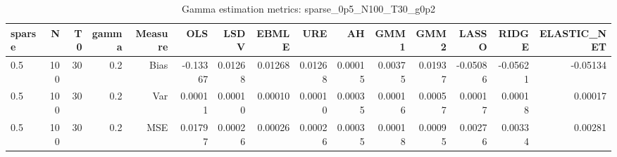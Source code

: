 \begin{table}[!htbp]\centering
\caption{Gamma estimation metrics: sparse_0p5_N100_T30_g0p2}
\label{tab:table1_sparse_0p5_N100_T30_g0p2}
\begin{tabular}{lrrrrrrrrrrrrrr}
\hline
sparse & N & T0 & gamma & Measure & OLS & LSDV & EBMLE & URE & AH & GMM1 & GMM2 & LASSO & RIDGE & ELASTIC_NET \\
\hline
0.5 & 100 & 30 & 0.2 & Bias & -0.13367 & 0.01268 & 0.01268 & 0.01268 & 0.00015 & 0.00375 & 0.01937 & -0.05086 & -0.05621 & -0.05134 \\
0.5 & 100 & 30 & 0.2 & Var & 0.00011 & 0.00010 & 0.00010 & 0.00010 & 0.00035 & 0.00016 & 0.00057 & 0.00017 & 0.00018 & 0.00017 \\
0.5 & 100 & 30 & 0.2 & MSE & 0.01797 & 0.00026 & 0.00026 & 0.00026 & 0.00035 & 0.00018 & 0.00095 & 0.00276 & 0.00334 & 0.00281 \\
\hline
\end{tabular}
\end{table}

